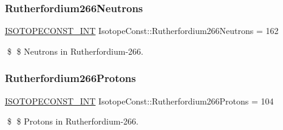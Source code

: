 \subsubsection{\texorpdfstring{Rutherfordium266\+Neutrons}{Rutherfordium266Neutrons}}
{\footnotesize\ttfamily \mbox{\hyperlink{group___isotope_const-_macros_ga5f18360b3e99483a35c32d789e62621c}{I\+S\+O\+T\+O\+P\+E\+C\+O\+N\+S\+T\+\_\+\+I\+NT}} Isotope\+Const\+::\+Rutherfordium266\+Neutrons = 162}

\$ \$ Neutrons in Rutherfordium-\/266. \mbox{\label{group___isotope_const-_rutherfordium-_rf266_ga51d4880de0008e7b1e6aa5df92f00a37}} 
\subsubsection{\texorpdfstring{Rutherfordium266\+Protons}{Rutherfordium266Protons}}
{\footnotesize\ttfamily \mbox{\hyperlink{group___isotope_const-_macros_ga5f18360b3e99483a35c32d789e62621c}{I\+S\+O\+T\+O\+P\+E\+C\+O\+N\+S\+T\+\_\+\+I\+NT}} Isotope\+Const\+::\+Rutherfordium266\+Protons = 104}

\$ \$ Protons in Rutherfordium-\/266. 